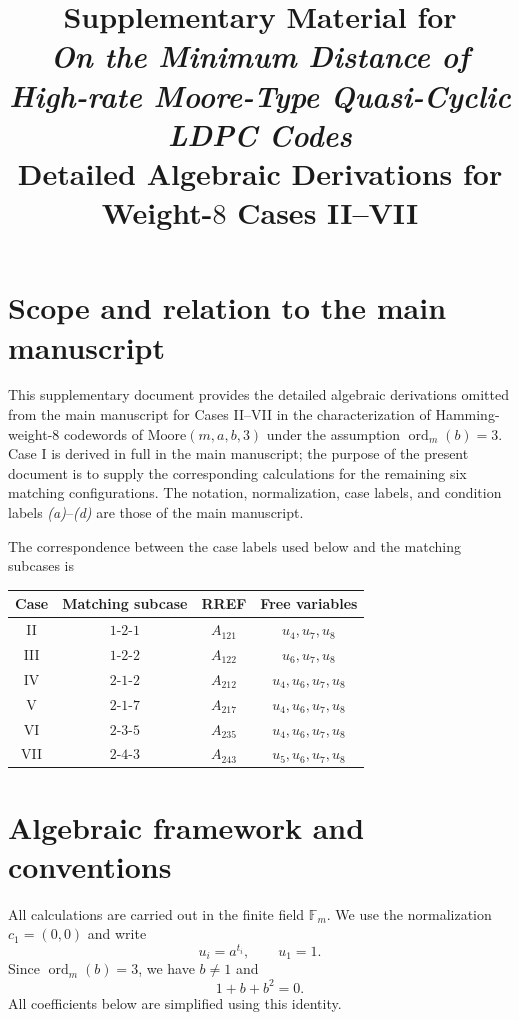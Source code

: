 \documentclass[11pt]{article}
\title{Supplementary Material for\\
\emph{On the Minimum Distance of High-rate Moore-Type Quasi-Cyclic LDPC Codes}\\[0.5ex]
\large Detailed Algebraic Derivations for Weight-$8$ Cases II--VII}
\author{}
\date{}
\newcommand{\F}{\mathbb{F}}
\begin{document}
\maketitle

\section{Scope and relation to the main manuscript}
This supplementary document provides the detailed algebraic derivations omitted from the main manuscript for Cases II--VII in the characterization of Hamming-weight-$8$ codewords of $\mathrm{Moore}(m,a,b,3)$ under the assumption $\operatorname{ord}_m(b)=3$.  Case I is derived in full in the main manuscript; the purpose of the present document is to supply the corresponding calculations for the remaining six matching configurations.  The notation, normalization, case labels, and condition labels \emph{(a)}--\emph{(d)} are those of the main manuscript.

The correspondence between the case labels used below and the matching subcases is
\begin{center}
\begin{tabular}{@{}cccc@{}}
\toprule
Case & Matching subcase & RREF & Free variables \\
\midrule
II   & $1\text{-}2\text{-}1$ & $A_{121}$ & $u_4,u_7,u_8$ \\
III  & $1\text{-}2\text{-}2$ & $A_{122}$ & $u_6,u_7,u_8$ \\
IV   & $2\text{-}1\text{-}2$ & $A_{212}$ & $u_4,u_6,u_7,u_8$ \\
V    & $2\text{-}1\text{-}7$ & $A_{217}$ & $u_4,u_6,u_7,u_8$ \\
VI   & $2\text{-}3\text{-}5$ & $A_{235}$ & $u_4,u_6,u_7,u_8$ \\
VII  & $2\text{-}4\text{-}3$ & $A_{243}$ & $u_5,u_6,u_7,u_8$ \\
\bottomrule
\end{tabular}
\end{center}

\section{Algebraic framework and conventions}
All calculations are carried out in the finite field $\F_m$.  We use the normalization $c_1=(0,0)$ and write
\[
u_i=a^{t_i},\qquad u_1=1.
\]
Since $\operatorname{ord}_m(b)=3$, we have $b\neq1$ and
\[
1+b+b^2=0.
\]
All coefficients below are simplified using this identity.
\end{document}
